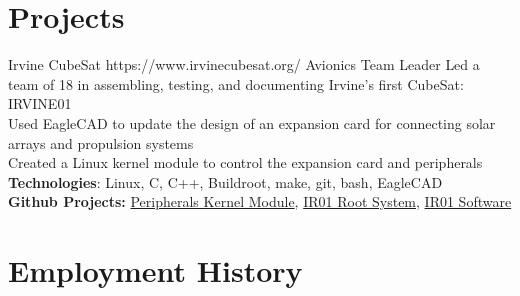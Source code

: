 \documentclass[10pt]{article} %
\begin{document}

\section{Projects}

{Irvine CubeSat}
{https://www.irvinecubesat.org/}
{Avionics Team Leader}
{
Led a team of 18 in assembling, testing, and documenting Irvine's first CubeSat: IRVINE01 \\
Used EagleCAD to update the design of an expansion card for connecting solar arrays and propulsion systems \\
Created a Linux kernel module to control the expansion card and peripherals \\[5pt]
\textbf{Technologies}: Linux, C, C++, Buildroot, make, git, bash, EagleCAD \\
\textbf{Github Projects:}
	\href{https://github.com/mark64/ccardmodule}{Peripherals Kernel Module},
	\href{https://github.com/mark64/buildroot}{IR01 Root System},
	\href{https://github.com/irvinecubesat/irvine-01-sw}{IR01 Software}
}




\section{Employment History}

\end{document}
